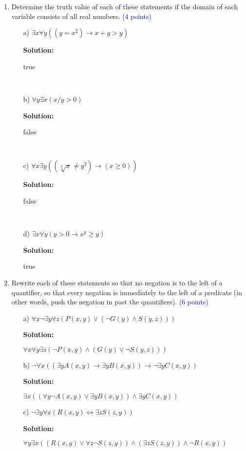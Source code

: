 \documentclass{article}
\newcommand{\pt}[1]{\textcolor{blue}{(#1 points)}}
\newenvironment{solution}
{
\par
\color{blue}
\textbf{Solution:}
}
{
\par
}
\begin{document}
\begin{enumerate}
\begin{enumerate}
    \end{enumerate}
    
    \item Determine the truth value of each of these statements if the domain of each variable consists of all real numbers. \pt{4}
    \begin{enumerate}
        \item[a)] $\exists x \forall y((y = x^2) \rightarrow x + y > y)$\
        \begin{solution}
        true
        \end{solution}\\
        \item[b)] $\forall y \exists x (x/y > 0)$\
        \begin{solution}
        false
        \end{solution}\\
        
        \item[c)] $\forall x \exists y((\sqrt[3]{x} \neq y^2) \rightarrow (x \geq 0))$\
        
        \begin{solution}
        false
        \end{solution}\\
        
        \item[d)] $\exists x \forall y(y > 0 \rightarrow x^y \geq y)$\
        
        \begin{solution}
        true
        \end{solution}
    \end{enumerate}
    
    \item Rewrite each of these statements so that no negation is to the left of a quantifier, so that every negation is immediately to the left of a predicate (in other words, push the negation in past the quantifiers). \pt{6}\\
    \begin{enumerate}
        \item[a)] $\forall x \neg \exists y \forall z (P(x, y) \lor (\lnot G(y) \land S(y, z)))$
        \begin{solution}
        $\forall x \forall y \exists z (\neg P(x, y) \land (G(y) \lor \neg S(y, z)))$
        \end{solution}
        \item[b)] $\neg \forall x (( \exists y A(x, y) \rightarrow \exists y B(x, y)) \rightarrow \neg \exists y C(x, y)) $
        \begin{solution}
        $\exists x (( \forall y \neg A(x, y) \lor \exists y B(x, y)) \land \exists y C(x, y))$
        \end{solution}
        \item[c)] $\neg  \exists y \forall x (R(x,y) \leftrightarrow \exists z S(z,y))$
        \begin{solution}
        $\forall y \exists x ((R(x, y) \lor \forall z \neg S(z, y)) \land (\exists z S(z, y)) \land \neg R(x,y))$
        \end{solution}
        

\end{enumerate}
\end{enumerate}
\end{document}
